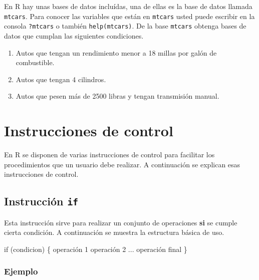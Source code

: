 \documentclass[10pt,]{krantz}
\makeatletter
\newenvironment{Shaded}{\begin{snugshade}}{\end{snugshade}}
\newcommand{\DecValTok}[1]{\textcolor[rgb]{0.00,0.00,0.81}{{#1}}}
\newcommand{\NormalTok}[1]{{#1}}
\providecommand{\tightlist}{%
  \setlength{\itemsep}{0pt}\setlength{\parskip}{0pt}}
\let\proglang=\textsf
\newenvironment{kframe}{%
\medskip{}
\setlength{\fboxsep}{.8em}
 \def\at@end@of@kframe{}%
 \ifinner\ifhmode%
  \def\at@end@of@kframe{\end{minipage}}%
  \begin{minipage}{\columnwidth}%
 \fi\fi%
 \def\FrameCommand##1{\hskip\@totalleftmargin \hskip-\fboxsep
 \colorbox{shadecolor}{##1}\hskip-\fboxsep
     \hskip-\linewidth \hskip-\@totalleftmargin \hskip\columnwidth}%
 \MakeFramed {\advance\hsize-\width
   \@totalleftmargin\z@ \linewidth\hsize
   \@setminipage}}%
 {\par\unskip\endMakeFramed%
 \at@end@of@kframe}
\renewenvironment{Shaded}{\begin{kframe}}{\end{kframe}}
\makeatother
\begin{document}
En \proglang{R} hay unas bases de datos incluídas, una de ellas es la
base de datos llamada \texttt{mtcars}. Para conocer las variables que
están en \texttt{mtcars} usted puede escribir en la consola
\texttt{?mtcars} o también \texttt{help(mtcars)}. De la base
\texttt{mtcars} obtenga bases de datos que cumplan las siguientes
condiciones.

\begin{enumerate}
\def\labelenumi{\arabic{enumi}.}
\setcounter{enumi}{21}
\tightlist
\item
  Autos que tengan un rendimiento menor a 18 millas por galón de
  combustible.
\item
  Autos que tengan 4 cilindros.
\item
  Autos que pesen más de 2500 libras y tengan transmisión manual.
\end{enumerate}

\chapter{\texorpdfstring{Instrucciones de control
\label{bucles}}{Instrucciones de control }}\label{instrucciones-de-control}

En \proglang{R} se disponen de varias instrucciones de control para
facilitar los procedimientos que un usuario debe realizar. A
continuación se explican esas instrucciones de control.

\section{\texorpdfstring{Instrucción \texttt{if}
}{Instrucción if }}\label{instruccion-if}

Esta instrucción sirve para realizar un conjunto de operaciones
\textbf{si} se cumple cierta condición. A continuación se muestra la
estructura básica de uso.

\begin{Shaded}
\begin{Highlighting}[]
\NormalTok{if (condicion) \{}
  \NormalTok{operación }\DecValTok{1}
  \NormalTok{operación }\DecValTok{2}
  \NormalTok{...}
  \NormalTok{operación final}
\NormalTok{\}}
\end{Highlighting}
\end{Shaded}

\subsection*{Ejemplo}\label{ejemplo-15}
\end{document}
